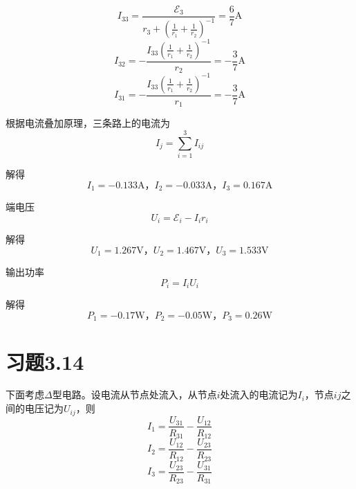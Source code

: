 \documentclass{SCIS2020cn}
\begin{document}
\begin{equation}
    I_{33}=\frac{\mathscr{E}_3}{r_3+\left(\frac{1}{r_1}+\frac{1}{r_2}\right)^{-1}}=\frac{6}{7}\text{A}
\end{equation}
\begin{equation}
    I_{32}=-\frac{I_{33}\left(\frac{1}{r_1}+\frac{1}{r_2}\right)^{-1}}{r_2}=-\frac{3}{7}\text{A}
\end{equation}
\begin{equation}
    I_{31}=-\frac{I_{33}\left(\frac{1}{r_1}+\frac{1}{r_2}\right)^{-1}}{r_1}=-\frac{3}{7}\text{A}
\end{equation}

根据电流叠加原理，三条路上的电流为
\begin{equation}
    I_j=\sum_{i=1}^3I_{ij}
\end{equation}

解得
\begin{equation}
    I_1=-0.133\text{A，}I_2=-0.033\text{A，}I_3=0.167\text{A}
\end{equation}

端电压
\begin{equation}
    U_i=\mathscr{E}_i-I_ir_i
\end{equation}

解得
\begin{equation}
    U_1=1.267\text{V，}U_2=1.467\text{V，}U_3=1.533\text{V}
\end{equation}

输出功率
\begin{equation}
    P_i=I_iU_i
\end{equation}

解得
\begin{equation}
    P_1=-0.17\text{W，}P_2=-0.05\text{W，}P_3=0.26\text{W}
\end{equation}

\section{习题3.14}

下面考虑$\Delta$型电路。设电流从节点处流入，从节点$i$处流入的电流记为$I_i$，节点$ij$之间的电压记为$U_{ij}$，则
\begin{equation}
    I_1=\frac{U_{31}}{R_{31}}-\frac{U_{12}}{R_{12}}
\end{equation}
\begin{equation}
    I_2=\frac{U_{12}}{R_{12}}-\frac{U_{23}}{R_{23}}
\end{equation}
\begin{equation}
    I_3=\frac{U_{23}}{R_{23}}-\frac{U_{31}}{R_{31}}
\end{equation}
\end{document}
